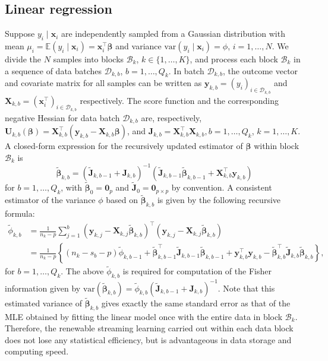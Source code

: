 \documentclass[12pt]{article}
\newcommand{\bJ}{\boldsymbol{J}}
\newcommand{\bU}{\boldsymbol{U}}
\newcommand{\bX}{\boldsymbol{X}}
\newcommand{\bx}{\boldsymbol{x}}
\newcommand{\by}{\boldsymbol{y}}
\newcommand{\bbeta}{\boldsymbol{\beta}}
\begin{document}
\subsection{Linear regression}
\label{subsec:examples:linear}
Suppose $y_i\mid\bx_i$ are independently sampled from a Gaussian distribution with mean $\mu_i=\mathbb{E}(y_i\mid\bx_i)=\bx_i^\top\bbeta$ and variance $\text{var}(y_i \mid\bx_i)=\phi$, $i=1, \ldots, N$. We divide the $N$ samples into blocks $\mathcal{B}_k$, $k \in \{1, \ldots, K\}$, and process each block $\mathcal{B}_k$ in a sequence of data batches $\mathcal{D}_{k, b}$, $b=1, \ldots, Q_k$. In batch $\mathcal{D}_{k, b}$, the outcome vector and covariate matrix for all samples can be written as $\by_{k, b}=(y_i)_{i \in \mathcal{D}_{k, b}}$ and $\bX_{k, b}=(\bx_i^\top)_{i \in \mathcal{D}_{k, b}}$ respectively. The score function and the corresponding negative Hessian for data batch $\mathcal{D}_{k,b}$ are, respectively, $\bU_{k,b}(\bbeta)=\bX_{k,b}^\top(\by_{k,b} - \bX_{k,b}\bbeta)$, and $\bJ_{k,b}=\bX_{k,b}^\top\bX_{k,b}, b =1,\ldots, Q_k$, $k=1, \ldots, K$. A closed-form expression for the recursively updated estimator of $\bbeta$ within block $\mathcal{B}_k$ is
\[
\widetilde{\bbeta}_{k,b} = \left(\widetilde{\bJ}_{k,b-1} + \bJ_{k,b} \right)^{-1} \left(\widetilde{\bJ}_{k,b-1}\widetilde{\bbeta}_{k,b-1} + \bX_{k,b}^\top\by_{k,b} \right)
\]
for $b=1,\ldots, Q_k$, with $\widetilde{\bbeta}_0=\bm{0}_p$ and $\widetilde{\bJ}_0=\bm{0}_{p\times p}$ by convention. A consistent estimator of the variance $\phi$ based on $\widetilde{\bbeta}_{k,b}$ is given by the following recursive formula:
\[
\begin{split}
\widetilde{\phi}_{k,b} &= \frac{1}{n_k-p} \sum_{j=1}^b(\by_{k,j}-\bX_{k,j}\widetilde{\bbeta}_{k,b})^\top(\by_{k,j}-\bX_{k,j}\widetilde{\bbeta}_{k,b}) \\
&= \frac{1}{n_k-p} \left\{(n_k-s_b-p)\widetilde{\phi}_{k,b-1} + 
\widetilde{\bbeta}_{k,b-1}^\top \widetilde{\bJ}_{k,b-1} \widetilde{\bbeta}_{k,b-1} + \by_{k,b}^\top\by_{k,b} - \widetilde{\bbeta}_{k,b}^\top\widetilde{\bJ}_{k,b}\widetilde{\bbeta}_{k,b}
\right\},
\end{split}
\]
for $b=1,\ldots, Q_k$. The above $\widetilde{\phi}_{k,b}$ is required for computation of the Fisher information given by $\text{var}(\widetilde{\bbeta}_{k,b})=\widetilde{\phi}_{k,b}(\widetilde{\bJ}_{k,b-1}+\bJ_{k,b})^{-1}$. Note that this estimated variance of $\widetilde{\bbeta}_{k,b}$ gives exactly the same standard error as that of the MLE obtained by fitting the linear model once with the entire data in block $\mathcal{B}_k$. Therefore, the renewable streaming learning carried out within each data block does not lose any statistical efficiency, but is advantageous in data storage and computing speed. 
\end{document}
